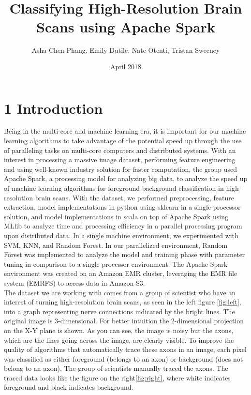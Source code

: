 \documentclass{neu_handout}
\title{Classifying High-Resolution Brain Scans using Apache Spark}
\author{Asha Chen-Phang, Emily Dutile, Nate Otenti, Tristan Sweeney}
\date{April 2018}
\begin{document}
\section*{1 Introduction}
Being in the multi-core and machine learning era, it is important for our machine learning algorithms to take advantage of the potential speed up through the use of paralleling tasks on multi-core computers and distributed systems. With an interest in processing a massive image dataset, performing feature engineering and using well-known industry solution for faster computation, the group used Apache Spark, a processing model for analyzing big data, to analyze the speed up of machine learning algorithms for foreground-background classification in high-resolution brain scans. With the dataset, we performed preprocessing, feature extraction, model implementations in python using sklearn in a single-processor solution, and model implementations in scala on top of Apache Spark using MLlib to analyze time and processing efficiency in a parallel processing program upon distributed data. In a single machine environment, we experimented with SVM, KNN, and Random Forest. In our parallelized environment, Random Forest was implemented to analyze the model and training phase with parameter tuning in comparison to a single processor environment. The Apache Spark environment was created on an Amazon EMR cluster, leveraging the EMR file system (EMRFS) to access data in Amazon S3.\\

The dataset we are working with comes from a group of scientist who have an interest of turning high-resolution brain scans, as seen in the left figure \ref{fig:left}, into a graph representing nerve connections indicated by the bright lines. The original image is 3-dimensional. For better intuition the 2-dimensional projection on the X-Y plane is shown. As you can see, the image is noisy but the axons, which are the lines going across the image, are clearly visible. To improve the quality of algorithms that automatically trace these axons in an image, each pixel was classified as either foreground (belongs to an axon) or background (does not belong to an axon). The group of scientists manually traced the axons. The traced data looks like the figure on the right\ref{fig:right}, where white indicates foreground and black indicates background.\\
\end{document}

